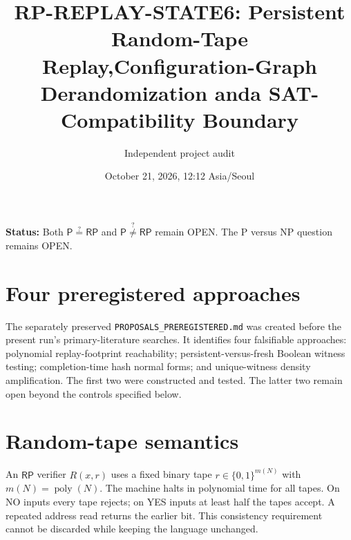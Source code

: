 \documentclass[11pt]{article}
\title{RP-REPLAY-STATE6: Persistent Random-Tape Replay,\newline Configuration-Graph Derandomization and\newline a SAT-Compatibility Boundary}
\author{Independent project audit}
\date{October 21, 2026, 12:12 Asia/Seoul}
\newcommand{\RP}{\mathsf{RP}}
\newcommand{\PP}{\mathsf{P}}
\newcommand{\poly}{\operatorname{poly}}
\begin{document}
\maketitle
\noindent\textbf{Status:} Both $\PP\stackrel{?}{=}\RP$ and $\PP\stackrel{?}{\ne}\RP$ remain OPEN. The P versus NP question remains OPEN.

\section{Four preregistered approaches}
The separately preserved \texttt{PROPOSALS\_PREREGISTERED.md} was created before the present run's primary-literature searches. It identifies four falsifiable approaches: polynomial replay-footprint reachability; persistent-versus-fresh Boolean witness testing; completion-time hash normal forms; and unique-witness density amplification. The first two were constructed and tested. The latter two remain open beyond the controls specified below.

\section{Random-tape semantics}
An $\RP$ verifier $R(x,r)$ uses a fixed binary tape $r\in\{0,1\}^{m(N)}$ with $m(N)=\poly(N)$. The machine halts in polynomial time for all tapes. On NO inputs every tape rejects; on YES inputs at least half the tapes accept. A repeated address read returns the earlier bit. This consistency requirement cannot be discarded while keeping the language unchanged.
\end{document}
